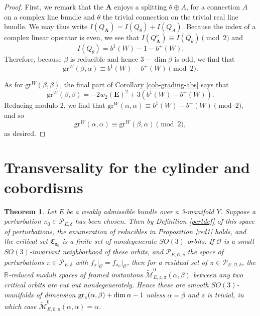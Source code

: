 \documentclass[10pt,a4paper]{amsart}
\newtheorem{theorem}{Theorem}
\theoremstyle{definition}
\theoremstyle{remark}
\numberwithin{figure}{qchap}
\begin{document}
\begin{proof}
First, we remark that the $\mathbf{A}$ enjoys a splitting $\theta \oplus A$, for a connection $A$ on a complex line bundle and $\theta$ the trivial connection on the trivial real line bundle. We may thus write $I(Q_{\mathbf{A}}) = I(Q_{\theta}) + I(Q_{A})$. Because the index of a complex linear operator is even, we see that $I(Q^\nu_{\mathbf{A}}) \equiv I(Q_\theta) \pmod 2$ and $$I(Q_\theta) = b^1(W) - 1 - b^+(W).$$ Therefore, because $\beta$ is reducible and hence $3 - \dim \beta$ is odd, we find that $$\text{gr}^W(\beta, \alpha) \equiv b^1(W) - b^+(W) \pmod 2.$$

As for $\text{gr}^W(\beta, \beta)$, the final part of Corollary \ref{cob-grading-abs} says that $$\text{gr}^W(\beta, \beta) = -2w_2(\mathbf{E})^2 + 3(b^1(W)-b^+(W)).$$ Reducing modulo $2$, we find that $\text{gr}^W(\alpha, \alpha) \equiv b^1(W) - b^+(W) \pmod 2,$ and so $$\text{gr}^W(\alpha, \alpha) \equiv \text{gr}^W(\beta, \alpha) \pmod 2,$$ as desired. 
\end{proof}

\section{Transversality for the cylinder and cobordisms}\label{sec:4d-trans}
\begin{theorem}\label{trans2}Let $E$ be a weakly admissible bundle over a 3-manifold $Y$. Suppose a perturbation $\pi_0\in \mathcal P_{E,\delta}$ has been chosen. Then by Definition \ref{pertdef} of this space of perturbations, the enumeration of reducibles in Proposition \ref{red1} holds, and the critical set $\mathfrak C_{\pi_0}$ is a finite set of nondegenerate $SO(3)$-orbits. If $\mathcal O$ is a small $SO(3)$-invariant neighborhood of these orbits, and $\mathcal P_{E,\mathcal O, \delta}$ the space of perturbations $\pi \in \mathcal P_{E,\delta}$ with $f_\pi\big|_{\mathcal O}= f_{\pi_0} \big|_{\mathcal O}$, then for a residual set of $\pi \in \mathcal P_{E,\mathcal O,\delta}$, the $\mathbb R$-reduced moduli spaces of framed instantons $\widetilde{\mathcal M}^0_{E,z,\pi}(\alpha, \beta)$ between any two critical orbits are cut out nondegenerately. Hence these are smooth $SO(3)$-manifolds of dimension $\textup{gr}_z(\alpha, \beta) + \dim \alpha - 1$ unless $\alpha = \beta$ and $z$ is trivial, in which case $\widetilde{\mathcal M}^0_{E,0,\pi}(\alpha, \alpha) = \alpha$.
\end{theorem}
\end{document}
